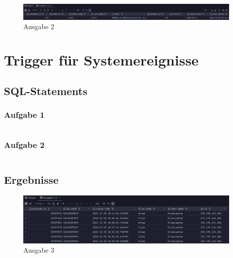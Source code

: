 \documentclass[12pt]{scrartcl}
\begin{document}
\begin{figure}[H]
	\centering
	\includegraphics[width=1\textwidth]{../2_3_7.png}
	\caption{Ausgabe 2}
\end{figure}

\pagebreak

\section{Trigger für Systemereignisse}

\subsection{SQL-Statements}

\subsubsection{Aufgabe 1}
\inputminted{sql}{../ue5_3_1.sql}

\subsubsection{Aufgabe 2}
\inputminted{sql}{../ue5_3_2.sql}

\subsection{Ergebnisse}

\begin{figure}[H]
	\centering
	\includegraphics[width=1\textwidth]{../3_2.png}
	\caption{Ausgabe 3}
\end{figure}
\end{document}
